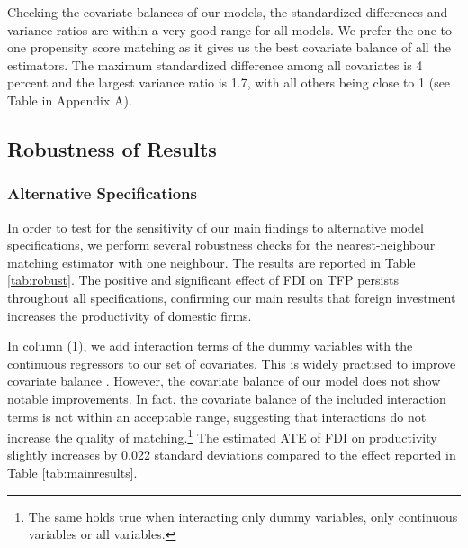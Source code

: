 \documentclass[a4paper,11pt]{scrartcl}
\begin{document}
Checking the covariate balances of our models, the standardized differences and variance ratios are within a very good range for all models. We prefer the one-to-one propensity score matching %
as it gives us the best covariate balance of all the estimators. The maximum standardized difference among all covariates is 4 percent and the largest variance ratio is 1.7, with all others being close to 1 (see Table %
in Appendix A). 


\subsection{Robustness of Results}

\subsubsection*{Alternative Specifications} 
In order to test for the sensitivity of our main findings to alternative model specifications, we perform several robustness checks for the nearest-neighbour matching estimator with one neighbour. %
 The results are reported in Table \ref{tab:robust}. The positive and significant effect of FDI on TFP persists throughout all specifications, confirming our main results that foreign investment increases the productivity of domestic firms. 

In column (1), we add interaction terms of the dummy variables with the continuous regressors to our set of covariates. This is widely practised to improve covariate balance \citep{Caliendo08}.
However, the covariate balance of our model does not show notable improvements. %
In fact, the covariate balance of the included interaction terms is not within an acceptable range, suggesting that interactions do not increase the quality of matching.\footnote{The same holds true when interacting only dummy variables, only continuous variables or all variables.} %
 The estimated ATE of FDI on productivity slightly increases by 0.022 standard deviations compared to the effect reported in Table \ref{tab:mainresults}. 
\end{document}
